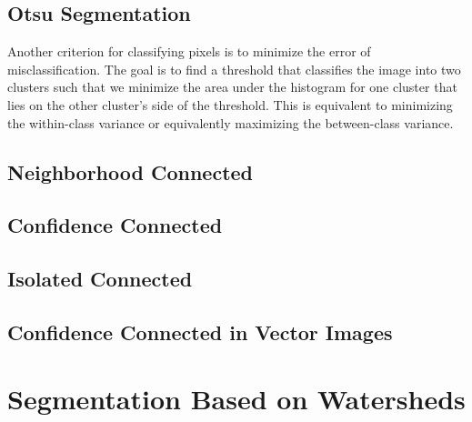 \label{sec:ConnectedThreshold}
\ifitkFullVersion

\fi

\subsection{Otsu Segmentation}
Another criterion for classifying pixels is to minimize the error of misclassification.
The goal is to find a threshold that classifies the image into two clusters such that
we minimize the area under the histogram for one cluster that lies on the other cluster's
side of the threshold. This is equivalent to minimizing the within-class variance
or equivalently maximizing the between-class variance.

\label{sec:OtsuThreshold}
\ifitkFullVersion

\fi

\label{sec:OtsuMultipleThreshold}
\ifitkFullVersion

\fi

\subsection{Neighborhood Connected}
\label{sec:NeighborhoodConnectedImageFilter}
\ifitkFullVersion

\fi


\subsection{Confidence Connected}
\label{sec:ConfidenceConnected}
\ifitkFullVersion


\fi




\subsection{Isolated Connected}
\label{sec:IsolatedConnected}
\ifitkFullVersion

\fi


\subsection{Confidence Connected in Vector Images}
\label{sec:VectorConfidenceConnected}
\ifitkFullVersion

\fi


\section{Segmentation Based on Watersheds}
\label{sec:WatershedSegmentation}
\ifitkFullVersion

\fi


